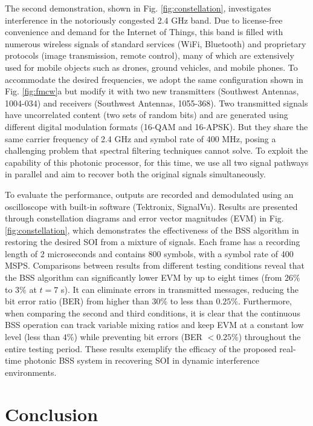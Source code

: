 \documentclass[pdflatex,mathphys]{sty}%
\begin{document}
The second demonstration, shown in Fig. \ref{fig:constellation}, investigates interference in the notoriously congested 2.4 GHz band. Due to license-free convenience and demand for the Internet of Things, this band is filled with numerous wireless signals of standard services (WiFi, Bluetooth) and proprietary protocols (image transmission, remote control), many of which are extensively used for mobile objects such as drones, ground vehicles, and mobile phones. To accommodate the desired frequencies, we adopt the same configuration shown in Fig. \ref{fig:fmcw}a but modify it with two new transmitters (Southwest Antennas, 1004-034) and receivers (Southwest Antennas, 1055-368). Two transmitted signals have uncorrelated content (two sets of random bits) and are generated using different digital modulation formats (16-QAM and 16-APSK). But they share the same carrier frequency of 2.4 GHz and symbol rate of 400 MHz, posing a challenging problem that spectral filtering techniques cannot solve. To exploit the capability of this photonic processor, for this time, we use all two signal pathways in parallel and aim to recover both the original signals simultaneously.

To evaluate the performance, outputs are recorded and demodulated using an oscilloscope with built-in software (Tektronix, SignalVu). Results are presented through constellation diagrams and error vector magnitudes (EVM) in  Fig. \ref{fig:constellation}, which demonstrates the effectiveness of the BSS algorithm in restoring the desired SOI from a mixture of signals. Each frame has a recording length of 2 microseconds and contains 800 symbols, with a symbol rate of 400 MSPS. Comparisons between results from different testing conditions reveal that the BSS algorithm can significantly lower EVM by up to eight times (from $26\%$ to $3\%$ at $t=7$ s). It can eliminate errors in transmitted messages, reducing the bit error ratio (BER) from higher than $30\%$ to less than $0.25\%$. Furthermore, when comparing the second and third conditions, it is clear that the continuous BSS operation can track variable mixing ratios and keep EVM at a constant low level (less than $4\%$) while preventing bit errors (BER $<0.25\%$) throughout the entire testing period. These results exemplify the efficacy of the proposed real-time photonic BSS system in recovering SOI in dynamic interference environments.

\section{Conclusion}
\end{document}
